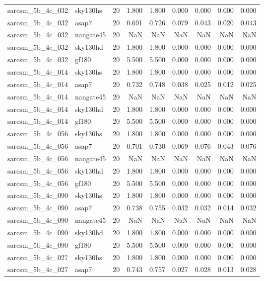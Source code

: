 \begin{tabular}{llrrrrrrr}
sarcsm\_5b\_4c\_032 & sky130hs & 20 & 1.800 & 1.800 & 0.000 & 0.000 & 0.000 & 0.000 \\
sarcsm\_5b\_4c\_032 & asap7 & 20 & 0.691 & 0.726 & 0.079 & 0.043 & 0.020 & 0.043 \\
sarcsm\_5b\_4c\_032 & nangate45 & 20 & NaN & NaN & NaN & NaN & NaN & NaN \\
sarcsm\_5b\_4c\_032 & sky130hd & 20 & 1.800 & 1.800 & 0.000 & 0.000 & 0.000 & 0.000 \\
sarcsm\_5b\_4c\_032 & gf180 & 20 & 5.500 & 5.500 & 0.000 & 0.000 & 0.000 & 0.000 \\
sarcsm\_5b\_4c\_014 & sky130hs & 20 & 1.800 & 1.800 & 0.000 & 0.000 & 0.000 & 0.000 \\
sarcsm\_5b\_4c\_014 & asap7 & 20 & 0.732 & 0.748 & 0.038 & 0.025 & 0.012 & 0.025 \\
sarcsm\_5b\_4c\_014 & nangate45 & 20 & NaN & NaN & NaN & NaN & NaN & NaN \\
sarcsm\_5b\_4c\_014 & sky130hd & 20 & 1.800 & 1.800 & 0.000 & 0.000 & 0.000 & 0.000 \\
sarcsm\_5b\_4c\_014 & gf180 & 20 & 5.500 & 5.500 & 0.000 & 0.000 & 0.000 & 0.000 \\
sarcsm\_5b\_4c\_056 & sky130hs & 20 & 1.800 & 1.800 & 0.000 & 0.000 & 0.000 & 0.000 \\
sarcsm\_5b\_4c\_056 & asap7 & 20 & 0.701 & 0.730 & 0.069 & 0.076 & 0.043 & 0.076 \\
sarcsm\_5b\_4c\_056 & nangate45 & 20 & NaN & NaN & NaN & NaN & NaN & NaN \\
sarcsm\_5b\_4c\_056 & sky130hd & 20 & 1.800 & 1.800 & 0.000 & 0.000 & 0.000 & 0.000 \\
sarcsm\_5b\_4c\_056 & gf180 & 20 & 5.500 & 5.500 & 0.000 & 0.000 & 0.000 & 0.000 \\
sarcsm\_5b\_4c\_090 & sky130hs & 20 & 1.800 & 1.800 & 0.000 & 0.000 & 0.000 & 0.000 \\
sarcsm\_5b\_4c\_090 & asap7 & 20 & 0.738 & 0.755 & 0.032 & 0.032 & 0.014 & 0.032 \\
sarcsm\_5b\_4c\_090 & nangate45 & 20 & NaN & NaN & NaN & NaN & NaN & NaN \\
sarcsm\_5b\_4c\_090 & sky130hd & 20 & 1.800 & 1.800 & 0.000 & 0.000 & 0.000 & 0.000 \\
sarcsm\_5b\_4c\_090 & gf180 & 20 & 5.500 & 5.500 & 0.000 & 0.000 & 0.000 & 0.000 \\
sarcsm\_5b\_4c\_027 & sky130hs & 20 & 1.800 & 1.800 & 0.000 & 0.000 & 0.000 & 0.000 \\
sarcsm\_5b\_4c\_027 & asap7 & 20 & 0.743 & 0.757 & 0.027 & 0.028 & 0.013 & 0.028 \\

\end{tabular}
